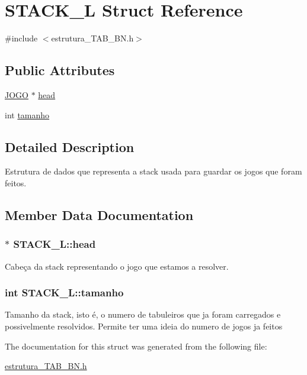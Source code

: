 \hypertarget{structSTACK__L}{\section{S\-T\-A\-C\-K\-\_\-\-L Struct Reference}
\label{structSTACK__L}
}


{\ttfamily \#include $<$estrutura\-\_\-\-T\-A\-B\-\_\-\-B\-N.\-h$>$}

\subsection*{Public Attributes}
\begin{DoxyCompactItemize}
\item 
\hyperlink{structJOGO}{J\-O\-G\-O} $\ast$ \hyperlink{structSTACK__L_a69c7e0a8504ed82dd11589aa0c714023}{head}
\item 
int \hyperlink{structSTACK__L_ac478e0116a0c43b0f3a69999d8ed4a13}{tamanho}
\end{DoxyCompactItemize}


\subsection{Detailed Description}
Estrutura de dados que representa a stack usada para guardar os jogos que foram feitos. 

\subsection{Member Data Documentation}
\hypertarget{structSTACK__L_a69c7e0a8504ed82dd11589aa0c714023}{
\subsubsection[{head}]{$\ast$ S\-T\-A\-C\-K\-\_\-\-L\-::head}}\label{structSTACK__L_a69c7e0a8504ed82dd11589aa0c714023}
Cabeça da stack representando o jogo que estamos a resolver. \hypertarget{structSTACK__L_ac478e0116a0c43b0f3a69999d8ed4a13}{
\subsubsection[{tamanho}]{\setlength{\rightskip}{0pt plus 5cm}int S\-T\-A\-C\-K\-\_\-\-L\-::tamanho}}\label{structSTACK__L_ac478e0116a0c43b0f3a69999d8ed4a13}
Tamanho da stack, isto é, o numero de tabuleiros que ja foram carregados e possivelmente resolvidos. Permite ter uma ideia do numero de jogos ja feitos 

The documentation for this struct was generated from the following file\-:\begin{DoxyCompactItemize}
\item 
\hyperlink{estrutura__TAB__BN_8h}{estrutura\-\_\-\-T\-A\-B\-\_\-\-B\-N.\-h}\end{DoxyCompactItemize}
